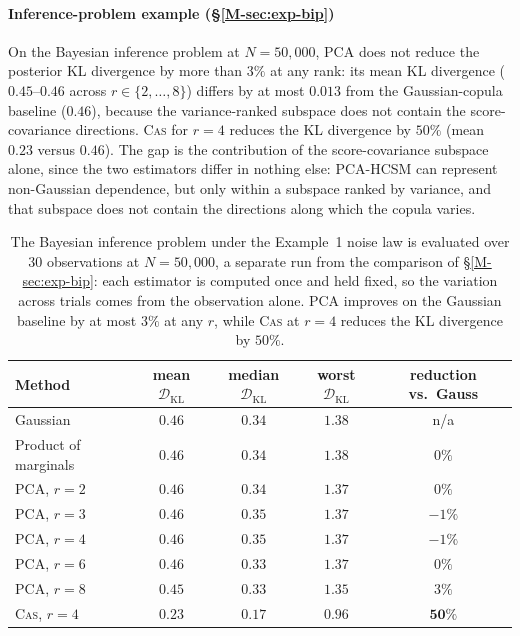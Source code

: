 \documentclass[supplement,review,hidelinks,onefignum,onetabnum]{siamart251216}
\newcommand{\DKL}{\mathcal{D}_{\mathrm{KL}}}
\begin{document}
\paragraph{Inference-problem example (\S\ref{M-sec:exp-bip})} On the Bayesian inference problem at $N = 50{,}000$, PCA does not reduce the posterior KL divergence by more than $3\%$ at any rank: its mean KL divergence ($0.45$--$0.46$ across $r \in \{2, \ldots, 8\}$) differs by at most $0.013$ from the Gaussian-copula baseline ($0.46$), because the variance-ranked subspace does not contain the score-covariance directions. \textsc{Cas} for $r = 4$ reduces the KL divergence by $50\%$ (mean $0.23$ versus $0.46$). The gap is the contribution of the score-covariance subspace alone, since the two estimators differ in nothing else: PCA-HCSM can represent non-Gaussian dependence, but only within a subspace ranked by variance, and that subspace does not contain the directions along which the copula varies.

\begin{table}[h]
\centering\footnotesize
\caption{The Bayesian inference problem under the Example~1 noise law is evaluated over $30$ observations at $N = 50{,}000$, a separate run from the comparison of \S\ref{M-sec:exp-bip}: each estimator is computed once and held fixed, so the variation across trials comes from the observation alone. PCA improves on the Gaussian baseline by at most $3\%$ at any $r$, while \textsc{Cas} at $r = 4$ reduces the KL divergence by $50\%$.}
\label{tab:pca-bip}
\begin{tabular}{lcccc}
\toprule
Method & mean $\DKL$ & median $\DKL$ & worst $\DKL$ & reduction vs.\ Gauss \\
\midrule
Gaussian            & $0.46$ & $0.34$ & $1.38$ & n/a \\
Product of marginals & $0.46$ & $0.34$ & $1.38$ & $0\%$ \\
PCA, $r=2$  & $0.46$ & $0.34$ & $1.37$ & $0\%$ \\
PCA, $r=3$  & $0.46$ & $0.35$ & $1.37$ & $-1\%$ \\
PCA, $r=4$  & $0.46$ & $0.35$ & $1.37$ & $-1\%$ \\
PCA, $r=6$  & $0.46$ & $0.33$ & $1.37$ & $0\%$ \\
PCA, $r=8$  & $0.45$ & $0.33$ & $1.35$ & $3\%$ \\
\textsc{Cas}, $r=4$ & $\mathbf{0.23}$ & $\mathbf{0.17}$ & $\mathbf{0.96}$ & $\mathbf{50\%}$ \\
\bottomrule
\end{tabular}
\end{table}
\end{document}

